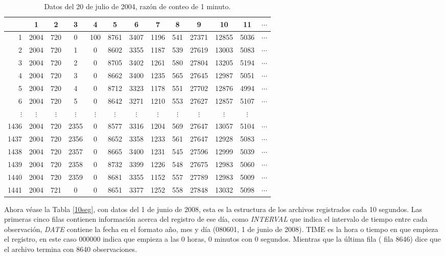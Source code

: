 \begin{table}[H]
  \centering
\centering
\begin{tabular}{r|cccccccccccc}
  & 1 & 2 & 3 & 4 & 5 & 6 & 7 & 8 & 9 & 10 & 11 & $\cdots$ \\
  \hline
1 & 2004 & 720 &   0 & 100 & 8761 & 3407 & 1196 & 541 & 27371 & 12855 & 5036 & $\cdots$\\ 
  2 & 2004 & 720 &   1 &   0 & 8602 & 3355 & 1187 & 539 & 27619 & 13003 & 5083 & $\cdots$\\ 
  3 & 2004 & 720 &   2 &   0 & 8705 & 3402 & 1261 & 580 & 27804 & 13205 & 5194 & $\cdots$\\ 
  4 & 2004 & 720 &   3 &   0 & 8662 & 3400 & 1235 & 565 & 27645 & 12987 & 5051 & $\cdots$\\ 
  5 & 2004 & 720 &   4 &   0 & 8712 & 3323 & 1178 & 551 & 27702 & 12876 & 4994 & $\cdots$\\ 
  6 & 2004 & 720 &   5 &   0 & 8642 & 3271 & 1210 & 553 & 27627 & 12857 & 5107 & $\cdots$\\ 
$\vdots$ & $\vdots$ & $\vdots$ & $\vdots$ & $\vdots$ & $\vdots$ & $\vdots$ & $\vdots$ & $\vdots$ & $\vdots$ & $\vdots$ & $\vdots$ &  \\
  1436 & 2004 & 720 & 2355 &   0 & 8577 & 3316 & 1204 & 569 & 27647 & 13057 & 5104 & $\cdots$\\ 
  1437 & 2004 & 720 & 2356 &   0 & 8652 & 3358 & 1233 & 561 & 27647 & 12928 & 5083 & $\cdots$\\ 
  1438 & 2004 & 720 & 2357 &   0 & 8665 & 3400 & 1231 & 545 & 27596 & 12999 & 5039 & $\cdots$ \\ 
  1439 & 2004 & 720 & 2358 &   0 & 8732 & 3399 & 1226 & 548 & 27675 & 12983 & 5060 & $\cdots$\\ 
  1440 & 2004 & 720 & 2359 &   0 & 8681 & 3355 & 1152 & 557 & 27789 & 12983 & 5009 & $\cdots$\\ 
  1441 & 2004 & 721 &   0 &   0 & 8651 & 3377 & 1252 & 558 & 27848 & 13032 & 5098 & $\cdots$\\ 
  
\end{tabular}

\caption{Datos del 20 de julio de 2004, razón de conteo de 1 minuto.}
\label{min}     
\end{table}


Ahora véase la Tabla \ref{10seg}, con datos del 1 de junio de 2008, esta es la estructura de los archivos registrados cada 10 segundos. Las primeras cinco filas contienen información acerca del registro de ese día, como \emph{INTERVAL} que indica el intervalo de tiempo entre cada observación, \emph{DATE}  contiene la fecha en el formato año, mes y día (080601, 1 de junio de 2008). TIME es la hora o tiempo en que empieza el registro, en este caso 000000 indica que empieza a las 0 horas, 0 minutos con 0 segundos. Mientras que la última fila ( fila 8646) dice que el archivo termina con 8640 observaciones.\\

